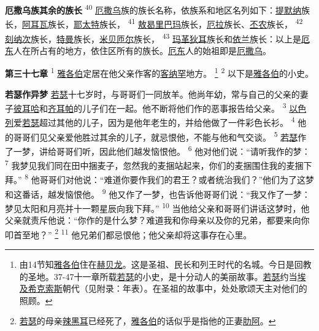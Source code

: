 \textbf{厄撒乌族其余的族长\quad}
\textsuperscript{40}
\uline{厄撒乌}族的族长名称，依族系和地区名列如下：\uline{提默纳}族长，\uline{阿耳瓦}族长，\uline{耶太特}族长，
\textsuperscript{41}
\uline{敖曷里}\uline{巴玛}族长，\uline{厄拉}族长、\uline{丕农}族长，
\textsuperscript{42}
\uline{刻纳次}族长，\uline{特曼}族长，\uline{米贝}\uline{匝尔}族长，
\textsuperscript{43}
\uline{玛革狄耳}族长和\uline{依兰}族长：以上是\uline{厄东}人在所占有的地方，依住区所有的族长。\uline{厄东}人的始祖即是\uline{厄撒乌}。

\textbf{第三十七章\quad}
\textsuperscript{1}
\uline{雅各伯}定居在他父亲作客的\uline{客纳罕}地方。
\footnote{由14节知\uline{雅各伯}住在\uline{赫贝龙}。这是圣祖、民长和列王时代的名城。今日是回教的圣地。37-47十一章所载\uline{若瑟}的小史，是十分动人的美丽故事。\uline{若瑟}约当\uline{埃及}\uline{希克索斯}朝代（见附录：年表）。在圣祖的故事中，处处歌颂天主对他们的照顾。}
\textsuperscript{2}
以下是\uline{雅各伯}的小史。

\textbf{若瑟作异梦\quad}
\uline{若瑟}十七岁时，与哥哥们一同放羊。他尚年幼，常与自己的父亲的妻子\uline{彼耳哈}和\uline{齐耳帕}的儿子们在一起。他不断将他们作的恶事报告给父亲。
\textsuperscript{3}
\uline{以色列}爱\uline{若瑟}超过其他的儿子，因为是他年老生的，并给他做了一件彩色长衫。
\textsuperscript{4}
他的哥哥们见父亲爱他胜过其余的儿子，就忌恨他，不能与他和气交谈。
\textsuperscript{5}
\uline{若瑟}作了一梦，讲给哥哥们听，因此他们越发恼恨他。
\textsuperscript{6}
他对他们说：“请听我作的梦：
\textsuperscript{7}
我梦见我们同在田中捆麦子，忽然我的麦捆站起来，你们的麦捆围住我的麦捆下拜。”
\textsuperscript{8}
他哥哥们对他说：“难道你要作我们的君王？或者统治我们？”他们为了这梦和这番话，越发恼恨他。
\textsuperscript{9}
他又作了一梦，也告诉他哥哥们说：“我又作了一梦：梦见太阳和月亮并十一颗星辰向我下拜。”
\textsuperscript{10}
当他给父亲和哥哥们讲话这梦时，他父亲就责斥他说：“你作的是什么梦？难道我和你母亲以及你的兄弟，都要来向你叩首至地？”
\footnote{\uline{若瑟}的母亲\uline{辣黑耳}已经死了，\uline{雅各伯}的话似乎是指他的正妻\uline{肋阿}。}
\textsuperscript{11}
他兄弟们都忌恨他；他父亲却将这事存在心里。

